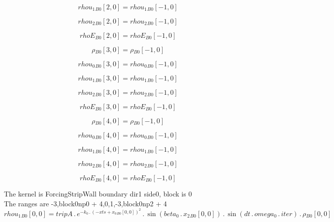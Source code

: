 \documentclass{article}
\begin{document}
\begin{dmath}{rhou_{1}{_{B0}}}[{2,0}] = {rhou_{1}{_{B0}}}[{-1,0}]\end{dmath}

\begin{dmath}{rhou_{2}{_{B0}}}[{2,0}] = {rhou_{2}{_{B0}}}[{-1,0}]\end{dmath}

\begin{dmath}{rhoE{_{B0}}}[{2,0}] = {rhoE{_{B0}}}[{-1,0}]\end{dmath}

\begin{dmath}{\rho{_{B0}}}[{3,0}] = {\rho{_{B0}}}[{-1,0}]\end{dmath}

\begin{dmath}{rhou_{0}{_{B0}}}[{3,0}] = {rhou_{0}{_{B0}}}[{-1,0}]\end{dmath}

\begin{dmath}{rhou_{1}{_{B0}}}[{3,0}] = {rhou_{1}{_{B0}}}[{-1,0}]\end{dmath}

\begin{dmath}{rhou_{2}{_{B0}}}[{3,0}] = {rhou_{2}{_{B0}}}[{-1,0}]\end{dmath}

\begin{dmath}{rhoE{_{B0}}}[{3,0}] = {rhoE{_{B0}}}[{-1,0}]\end{dmath}

\begin{dmath}{\rho{_{B0}}}[{4,0}] = {\rho{_{B0}}}[{-1,0}]\end{dmath}

\begin{dmath}{rhou_{0}{_{B0}}}[{4,0}] = {rhou_{0}{_{B0}}}[{-1,0}]\end{dmath}

\begin{dmath}{rhou_{1}{_{B0}}}[{4,0}] = {rhou_{1}{_{B0}}}[{-1,0}]\end{dmath}

\begin{dmath}{rhou_{2}{_{B0}}}[{4,0}] = {rhou_{2}{_{B0}}}[{-1,0}]\end{dmath}

\begin{dmath}{rhoE{_{B0}}}[{4,0}] = {rhoE{_{B0}}}[{-1,0}]\end{dmath}

\noindent The kernel is ForcingStripWall boundary dir1 side0, block is 0\\\noindent The ranges are -3,block0np0 + 4,0,1,-3,block0np2 + 4\\\begin{dmath}{rhou_{1}{_{B0}}}[{0,0}] = tripA \,.\, e^{- k_0 \,.\, \left(- xts + {x_{0}{_{B0}}}[{0,0}] \right)^{2}} \,.\, \sin{\left (beta_0 \,.\, {x_{2}{_{B0}}}[{0,0}] \right )} \,.\, \sin{\left (dt \,.\, omega_0 \,.\, iter \right )} \,.\, 
{\rho{_{B0}}}[{0,0}]\end{dmath}
\end{document}
